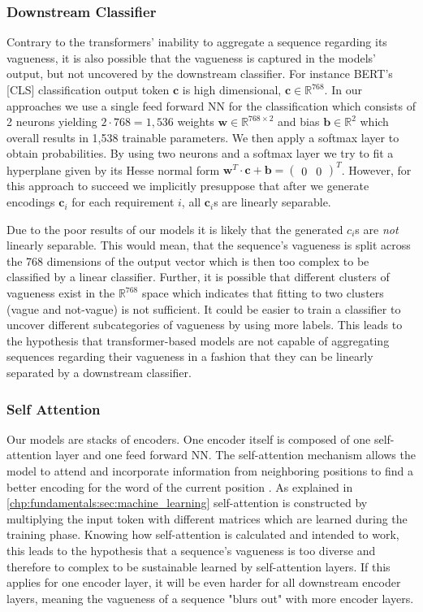 \subsubsection{Downstream Classifier}
\label{chp:study:sec:interpretation:subsec:causes:downstream_classifier}
Contrary to the transformers' inability to aggregate a sequence regarding its vagueness, it is also possible that the vagueness is captured in the models' output, but not uncovered by the downstream classifier.
For instance \ac{BERT}'s [CLS] classification output token $\bm{c}$ is high dimensional, $\bm{c} \in \mathbb{R}^{768}$.
In our approaches we use a single feed forward \ac{NN} for the classification which consists of 2 neurons yielding $2 \cdot 768 = 1,536$ weights $\bm{w} \in \mathbb{R}^{768 \times 2}$ and bias $\bm{b} \in \mathbb{R}^2$ which overall results in 1,538 trainable parameters.
We then apply a softmax layer to obtain probabilities.
By using two neurons and a softmax layer we try to fit a hyperplane given by its Hesse normal form $ \bm{w}^T \cdot \bm{c} + \bm{b} = \begin{pmatrix} 0 & 0 \end{pmatrix}^T$.
However, for this approach to succeed we implicitly presuppose that after we generate encodings $\bm{c}_i$ for each requirement $i$, all $\bm{c}_i$s are linearly separable.

Due to the poor results of our models it is likely that the generated $c_i$s are \textit{not} linearly separable.
This would mean, that the sequence's vagueness is split across the 768 dimensions of the output vector which is then too complex to be classified by a linear classifier.
Further, it is possible that different clusters of vagueness exist in the $\mathbb{R}^{768}$ space which indicates that fitting to two clusters (vague and not-vague) is not sufficient.
It could be easier to train a classifier to uncover different subcategories of vagueness by using more labels.
This leads to the hypothesis that transformer-based models are not capable of aggregating sequences regarding their vagueness in a fashion that they can be linearly separated by a downstream classifier.

\subsubsection{Self Attention}
\label{chp:study:sec:interpretation:subsec:causes:self_attention}
Our models are stacks of encoders.
One encoder itself is composed of one self-attention layer and one feed forward \ac{NN}.
The self-attention mechanism allows the model to attend and incorporate information from neighboring positions to find a better encoding for the word of the current position \parencite{Vaswani:2017}.
As explained in \cref{chp:fundamentals:sec:machine_learning} self-attention is constructed by multiplying the input token with different matrices which are learned during the training phase.
Knowing how self\nobreakdash-attention is calculated and intended to work, this leads to the hypothesis that a sequence's vagueness is too diverse and therefore to complex to be sustainable learned by self-attention layers.
If this applies for one encoder layer, it will be even harder for all downstream encoder layers, meaning the vagueness of a sequence "blurs out" with more encoder layers.
